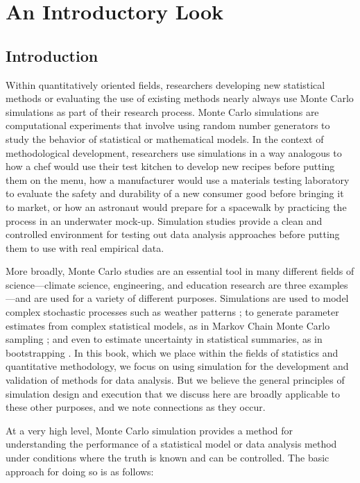 \documentclass[
]{book}
\begin{document}
\part{An Introductory Look}\label{part-an-introductory-look}

\chapter{Introduction}\label{introduction}

Within quantitatively oriented fields, researchers developing new statistical methods or evaluating the use of existing methods nearly always use Monte Carlo simulations as part of their research process.
Monte Carlo simulations are computational experiments that involve using random number generators to study the behavior of statistical or mathematical models.
In the context of methodological development, researchers use simulations in a way analogous to how a chef would use their test kitchen to develop new recipes before putting them on the menu, how a manufacturer would use a materials testing laboratory to evaluate the safety and durability of a new consumer good before bringing it to market, or how an astronaut would prepare for a spacewalk by practicing the process in an underwater mock-up.
Simulation studies provide a clean and controlled environment for testing out data analysis approaches before putting them to use with real empirical data.

More broadly, Monte Carlo studies are an essential tool in many different fields of science---climate science, engineering, and education research are three examples---and are used for a variety of different purposes.
Simulations are used to model complex stochastic processes such as weather patterns \citep{jones2012IntroductionScientificProgramming, robert2010IntroducingMonteCarlo};
to generate parameter estimates from complex statistical models, as in Markov Chain Monte Carlo sampling \citep{gelman2013BayesianDataAnalysis};
and even to estimate uncertainty in statistical summaries, as in bootstrapping \citep{davison1997BootstrapMethodsTheir}.
In this book, which we place within the fields of statistics and quantitative methodology, we focus on using simulation for the development and validation of methods for data analysis.
But we believe the general principles of simulation design and execution that we discuss here are broadly applicable to these other purposes, and we note connections as they occur.

At a very high level, Monte Carlo simulation provides a method for understanding the performance of a statistical model or data analysis method under conditions where the truth is known and can be controlled.
The basic approach for doing so is as follows:
\end{document}
